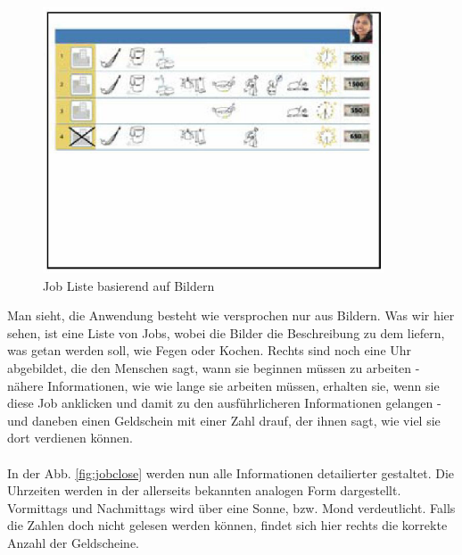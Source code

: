 \begin{figure}[h]
	\centering
		\includegraphics[width=0.90\textwidth]{Daten/job_list.PNG}
	\caption{Job Liste basierend auf Bildern}
	\label{fig:joblist}
\end{figure}

Man sieht, die Anwendung besteht wie versprochen nur aus Bildern. Was wir hier sehen, ist eine Liste von Jobs, wobei die Bilder die Beschreibung zu dem liefern, was getan werden soll, wie Fegen oder Kochen. Rechts sind noch eine Uhr abgebildet, die den Menschen sagt, wann sie beginnen müssen zu arbeiten - nähere Informationen, wie wie lange sie arbeiten müssen, erhalten sie, wenn sie diese Job anklicken und damit zu den ausführlicheren Informationen gelangen - und daneben einen Geldschein mit einer Zahl drauf, der ihnen sagt, wie viel sie dort verdienen können.\\\\
In der Abb. \ref{fig:jobclose} werden nun alle Informationen detailierter gestaltet. Die Uhrzeiten werden in der allerseits bekannten analogen Form dargestellt. Vormittags und Nachmittags wird über eine Sonne, bzw. Mond verdeutlicht. Falls die Zahlen doch nicht gelesen werden können, findet sich hier rechts die korrekte Anzahl der Geldscheine.\\\\

